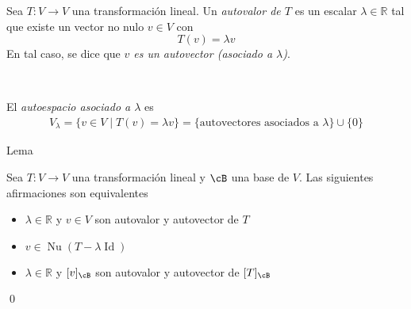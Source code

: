 \documentclass{beamer} %
\newcommand{\Id}{\operatorname{Id}}
\newcommand{\R}{\mathbb R}
\begin{document}
\begin{frame}

\begin{definicion}

Sea $T:V\longrightarrow V$ una transformación lineal. Un \textit{autovalor de $T$} es un escalar \textit{$\lambda\in\R$} tal que existe un vector no nulo \textit{$v\in V$} con 
$$T(v)=\lambda v$$
En tal caso, se dice que \textit{$v$ es un autovector (asociado a $\lambda$)}.\pause

\

El \textit{autoespacio asociado a $\lambda$} es
\begin{align*}
V_\lambda=\{v\in V\mid T(v)=\lambda v\}=\{\mbox{autovectores asociados a $\lambda$}\}\cup \{0\} 
\end{align*}
\end{definicion}


\end{frame}



\begin{frame}
    
    \begin{block}{Lema}
        
        Sea $T:V\longrightarrow V$ una transformación lineal y $\cB$ una base de $V$. Las siguientes afirmaciones son equivalentes\pause
        \begin{itemize}
            \item $\lambda\in\R$ y $v\in V$ son autovalor y autovector de $T$\pause
            \item $v\in\operatorname{Nu}(T-\lambda\Id)$\pause
            
            \item $\lambda\in\R$ y $[v]_\cB$ son autovalor y autovector de $[T]_\cB$
        \end{itemize}
    \end{block}\pause
    
    \qed
    
\end{frame}
\end{document}
